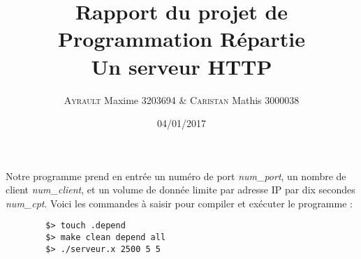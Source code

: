 \documentclass[final,12pt]{article}
\begin{document}
%
\title{Rapport du projet de Programmation Répartie\\Un serveur HTTP}
\author{\textsc{Ayrault} Maxime 3203694 \& \textsc{Caristan} Mathis 3000038}
%
\date{04/01/2017}

\maketitle

	Notre programme prend en entrée un numéro de port \textit{num\_port}, un nombre de client \textit{num\_client}, et un volume de donnée limite par adresse IP par dix secondes \textit{num\_cpt}.
	Voici les commandes à saisir pour compiler et exécuter le programme :
	\begin{verbatim}
		$> touch .depend
		$> make clean depend all
		$> ./serveur.x 2500 5 5
	\end{verbatim}
\end{document}
